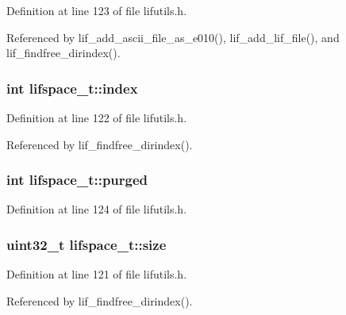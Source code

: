 Definition at line 123 of file lifutils.\+h.



Referenced by lif\+\_\+add\+\_\+ascii\+\_\+file\+\_\+as\+\_\+e010(), lif\+\_\+add\+\_\+lif\+\_\+file(), and lif\+\_\+findfree\+\_\+dirindex().

\subsubsection[{\texorpdfstring{index}{index}}]{\setlength{\rightskip}{0pt plus 5cm}int lifspace\+\_\+t\+::index}\hypertarget{structlifspace__t_abcca3daca009eca56173dc8577d597da}{}\label{structlifspace__t_abcca3daca009eca56173dc8577d597da}


Definition at line 122 of file lifutils.\+h.



Referenced by lif\+\_\+findfree\+\_\+dirindex().

\subsubsection[{\texorpdfstring{purged}{purged}}]{\setlength{\rightskip}{0pt plus 5cm}int lifspace\+\_\+t\+::purged}\hypertarget{structlifspace__t_a53fce276ffb7bb4f8556cc2e7ac76390}{}\label{structlifspace__t_a53fce276ffb7bb4f8556cc2e7ac76390}


Definition at line 124 of file lifutils.\+h.

\subsubsection[{\texorpdfstring{size}{size}}]{\setlength{\rightskip}{0pt plus 5cm}uint32\+\_\+t lifspace\+\_\+t\+::size}\hypertarget{structlifspace__t_a0519f0089ed8694cbb2208364c6b31bd}{}\label{structlifspace__t_a0519f0089ed8694cbb2208364c6b31bd}


Definition at line 121 of file lifutils.\+h.



Referenced by lif\+\_\+findfree\+\_\+dirindex().

